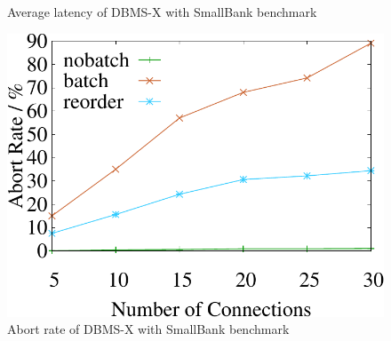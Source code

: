 \begin{figure}[t]
\begin{minipage}[b]{0.31\linewidth}
		\caption{Average latency of DBMS-X with SmallBank benchmark}
		\label{fig:hekaton:latency}
	\end{minipage}
	\begin{minipage}[b]{0.31\linewidth}
		\centering
		\includegraphics[width=\textwidth]{./exp_fig/hekaton/pdf/hekaton_abort}
		\caption{Abort rate of DBMS-X with SmallBank benchmark}
		\label{fig:hekaton:abort}
	\end{minipage}
\end{figure}

